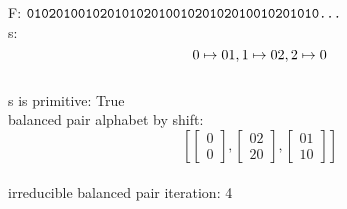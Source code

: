 F: $ \text{\texttt{0102010010201010201001020102010010201010...}}  $ \\
s: $$0 \mapsto 01\\, 1 \mapsto 02\\, 2 \mapsto 0\\$$ \\
s is primitive: True  \\
balanced pair alphabet by shift: $$ \left[\begin{bmatrix}0\\ 0\end{bmatrix}, \begin{bmatrix}02\\ 20\end{bmatrix}, \begin{bmatrix}01\\ 10\end{bmatrix}\right] $$ \\
irreducible balanced pair iteration: 4  \\ 
